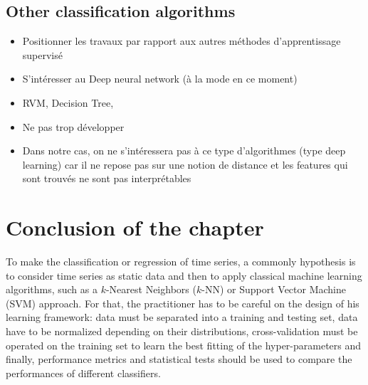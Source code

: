 \subsection{Other classification algorithms}
\begin{itemize}
	\item Positionner les travaux par rapport aux autres méthodes d'apprentissage supervisé
	\item S'intéresser au Deep neural network (à la mode en ce moment)
	\item RVM, Decision Tree, 
	\item Ne pas trop développer
	\item Dans notre cas, on ne s'intéressera pas à ce type d'algorithmes (type deep learning) car il ne repose pas sur une notion de distance et les features qui sont trouvés ne sont pas interprétables
\end{itemize}



\section{Conclusion of the chapter}

To make the classification or regression of time series, a commonly hypothesis is to consider time series as static data and then to apply classical machine learning algorithms, such as a $k$-Nearest Neighbors ($k$-NN) or Support Vector Machine (SVM) approach. For that, the practitioner has to be careful on the design of his learning framework: data must be separated into a training and testing set, data have to be normalized depending on their distributions, cross-validation must be operated on the training set to learn the best fitting of the hyper-parameters and finally, performance metrics and statistical tests should be used to compare the performances of different classifiers.

